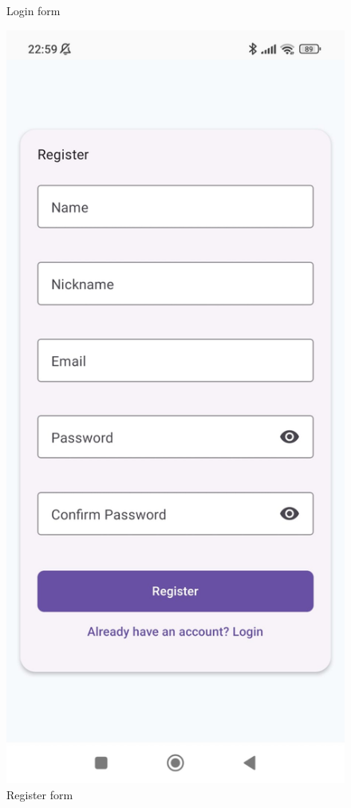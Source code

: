 \documentclass[11pt,a4paper]{article}
\begin{document}
\begin{figure}[H]
\begin{minipage}{0.35\textwidth}
        \caption*{Login form}
    \end{minipage}
    \hfill
    \begin{minipage}{0.35\textwidth}
        \centering
        \includegraphics[width=\linewidth]{Images/Register form.jpeg}
        \caption*{Register form}
    \end{minipage}
\end{figure}
\end{document}
